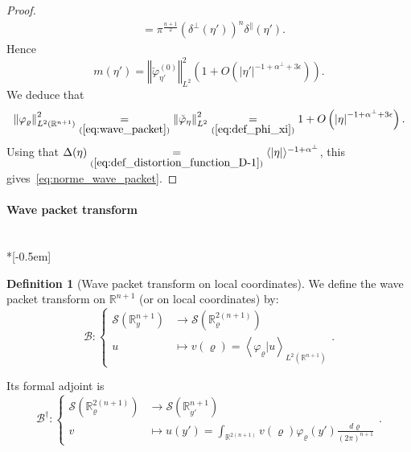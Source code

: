 \documentclass[10pt]{amsart}
\theoremstyle{definition}\newtheorem{defi}[theo]{Definition}\newtheorem{rema}[theo]{Remark}\newtheorem{exam}[theo]{Example}\newtheorem{exem}[theo]{Example}\newtheorem{nota}[theo]{Notation}
\newcommand*\eq[1]{\underset{(#1)}{=}}
\newcommand{\clS}{\mathcal{S}}
\newcommand{\clB}{\mathcal{B}}
\newcommand{\bbR}{\mathbb{R}}
\begin{document}
\begin{proof}
\begin{align*}
&=\pi^{\frac{n+1}{2}}\left(\delta^{\perp}\left(\eta'\right)\right)^{n}\delta^{\parallel}\left(\eta'\right).
\end{align*}
Hence
\[
m\left(\eta'\right)=\left\Vert \check{\varphi}_{\eta'}^{\left(0\right)}\right\Vert _{L^{2}}^{2}\left(1+O\left(\left|\eta'\right|^{-1+\alpha^{\perp}+3\epsilon}\right)\right).
\]
We deduce that
\[
\left\Vert \varphi_{\varrho}\right\Vert _{L^{2}\left(\bbR^{n+1}\right)}^{2}\eq{\ref{eq:wave_packet}}\left\Vert \check{\varphi}_{\eta}\right\Vert _{L^{2}}^{2}\eq{\ref{eq:def_phi_xi}}1+O\left(\left|\eta\right|^{-1+\alpha^{\perp}+3\epsilon}\right).
\]
Using that $\Delta(\eta)\eq{\ref{eq:def_distortion_function_D-1}}
\langle|\eta|\rangle^{-1+\alpha^{\perp}}$, this gives~\eqref{eq:norme_wave_packet}.
\end{proof}

\paragraph{Wave packet transform}\ \\*[-0.5em]

\begin{cBoxA}{}
\begin{defi}[Wave packet transform on local coordinates]
We define the wave packet transform on $\bbR^{n+1}$ (or on local coordinates) by:
\begin{equation}\label{eq:def_Bargamnn_B}
\clB:
\begin{cases}
\clS\left(\bbR_{y}^{n+1}\right) & \rightarrow\clS\left(\bbR_{\varrho}^{2\left(n+1\right)}\right)\\
u & \mapsto v\left(\varrho\right)=\left\langle \varphi_{\varrho}|u\right\rangle _{L^{2}\left(\bbR^{n+1}\right)}
\end{cases}.
\end{equation}
\end{defi}
\end{cBoxA}

Its formal adjoint is
\begin{equation}\label{eq:def_Bargamnn_*}
\clB^{\dagger}:
\begin{cases}
\clS\left(\bbR_{\varrho}^{2\left(n+1\right)}\right) & \rightarrow\clS\left(\bbR_{y'}^{n+1}\right)\\
v & \mapsto u\left(y'\right)=\int_{\bbR^{2\left(n+1\right)}}v\left(\varrho\right)\varphi_{\varrho}\left(y'\right)\frac{d\varrho}{\left(2\pi\right)^{n+1}}
\end{cases}.
\end{equation}
\end{document}
